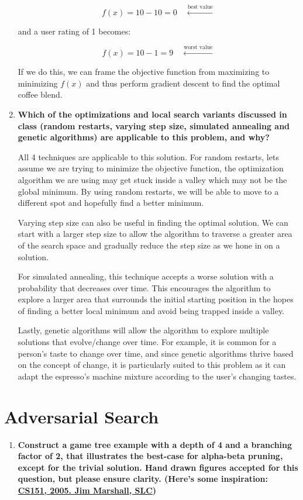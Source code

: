 \documentclass[a4paper]{article}
\begin{document}
\begin{sloppypar}
\begin{enumerate}[start=9,label=Q\arabic*,left=0pt]
    \[ f(x) = 10 - 10 = 0 \quad \xleftarrow{\text{best value}} \]

    and a user rating of 1 becomes:

    \[ f(x) = 10 - 1 = 9 \quad \xleftarrow{\text{worst value}} \]

    If we do this, we can frame the objective function from maximizing to minimizing $f(x)$ and thus perform gradient descent
    to find the optimal coffee blend.

    \item \textbf{Which of the optimizations and local search variants discussed in class (random restarts, varying step size, simulated annealing and genetic algorithms) are applicable to this problem, and why?}
    
    \par All 4 techniques are applicable to this solution. For random restarts, lets assume we are trying to minimize the objective
    function, the optimization algorithm we are using may get stuck inside a valley which may not be the global minimum. By using random
    restarts, we will be able to move to a different spot and hopefully find a better minimum.

    Varying step size can also be useful in finding the optimal solution. We can start with a larger step size to allow the algorithm
    to traverse a greater area of the search space and gradually reduce the step size as we hone in on a solution. 

    For simulated annealing, this technique accepts a worse solution with a probability that decreases over time. This encourages the algorithm
    to explore a larger area that surrounds the initial starting position in the hopes of finding a better local minimum and avoid being trapped
    inside a valley. 

    Lastly, genetic algorithms will allow the algorithm to explore multiple solutions that evolve/change over time. For example,
    it is common for a person's taste to change over time, and since genetic algorithms thrive based on the concept of change, it is particularly suited
    to this problem as it can adapt the espresso's machine mixture according to the user's changing tastes.
\end{enumerate}

\section{Adversarial Search}

\begin{enumerate}[start=12,label=Q\arabic*,left=0pt]
    \item \textbf{Construct a game tree example with a depth of 4 and a branching factor of 2, that illustrates the best-case for alpha-beta pruning, except for the trivial solution. Hand drawn figures accepted for this question, but please ensure clarity. 
    (Here's some inspiration: \href{https://science.slc.edu/~jmarshall/courses/2005/fall/cs151/lectures/minimax/BestCase.html}{CS151, 2005. Jim Marshall, SLC})}    
    

\end{enumerate}
\end{sloppypar}
\end{document}
